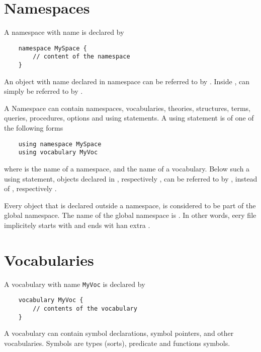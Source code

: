 \documentclass[a4]{article}
\begin{document}
\section{Namespaces}

A namespace with name  is declared by
\begin{lstlisting}
	namespace MySpace {
		// content of the namespace
	}
\end{lstlisting}

An object with name  declared in namespace  can be referred to by .  Inside ,  can simply be referred to by .

A Namespace can contain namespaces, vocabularies, theories, structures, terms, queries, procedures, options and using statements.  A using statement is of one of the following forms
\begin{lstlisting}
	using namespace MySpace
	using vocabulary MyVoc
\end{lstlisting}
where  is the name of a namespace, and  the name of a vocabulary.  Below such a using statement, objects  declared in , respectively , can be referred to by , instead of , respectively .

Every object that is declared outside a namespace, is considered to be part of the global namespace.  The name of the global namespace is .  In other words, eery \idp file implicitely starts with  and ends wit han extra \code{\}}.


\section{Vocabularies}

A vocabulary with name {\tt MyVoc} is declared by
\begin{lstlisting}
	vocabulary MyVoc {
		// contents of the vocabulary
	}
\end{lstlisting}
A vocabulary can contain symbol declarations, symbol pointers, and other vocabularies. Symbols are types (sorts), predicate and functions symbols.


\end{document}
